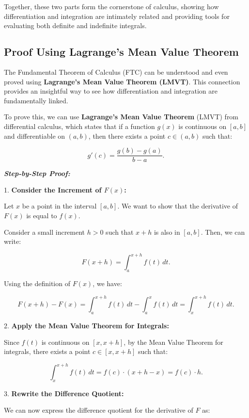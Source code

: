 \documentclass[a4paper,12pt]{book}
\begin{document}
Together, these two parts form the cornerstone of calculus, showing how differentiation and integration are intimately related and providing tools for evaluating both definite and indefinite integrals.

\subsection{Proof Using Lagrange's Mean Value Theorem}

The Fundamental Theorem of Calculus (FTC) can be understood and even proved using \textbf{Lagrange's Mean Value Theorem (LMVT)}. This connection provides an insightful way to see how differentiation and integration are fundamentally linked.

To prove this, we can use \textbf{Lagrange's Mean Value Theorem} (LMVT) from differential calculus, which states that if a function \( g(x) \) is continuous on \([a, b]\) and differentiable on \((a, b)\), then there exists a point \( c \in (a, b) \) such that:

\[
g'(c) = \dfrac{g(b) - g(a)}{b - a}.
\]

\textit{\textbf{Step-by-Step Proof:}}

1. \textbf{Consider the Increment of \( F(x) \):}

   Let \( x \) be a point in the interval \([a, b]\). We want to show that the derivative of \( F(x) \) is equal to \( f(x) \).

   Consider a small increment \( h > 0 \) such that \( x + h \) is also in \([a, b]\). Then, we can write:

   \[
   F(x + h) = \int_{a}^{x + h} f(t) \, dt.
   \]

   Using the definition of \( F(x) \), we have:

   \[
   F(x + h) - F(x) = \int_{a}^{x + h} f(t) \, dt - \int_{a}^{x} f(t) \, dt = \int_{x}^{x + h} f(t) \, dt.
   \]

2. \textbf{Apply the Mean Value Theorem for Integrals:}

   Since \( f(t) \) is continuous on \([x, x + h]\), by the Mean Value Theorem for integrals, there exists a point \( c \in [x, x + h] \) such that:

   \[
   \int_{x}^{x + h} f(t) \, dt = f(c) \cdot (x + h - x) = f(c) \cdot h.
   \]

3. \textbf{Rewrite the Difference Quotient:}

   We can now express the difference quotient for the derivative of \( F \) as:
\end{document}
